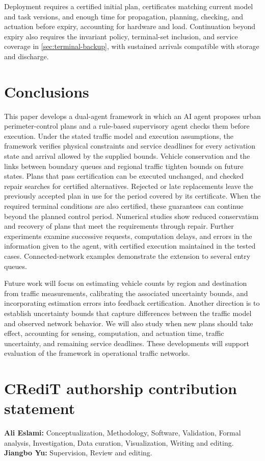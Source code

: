 \documentclass[preprint,12pt]{elsarticle}
\theoremstyle{definition}
\theoremstyle{plain}
\theoremstyle{definition}
\theoremstyle{plain}
\newcommand{\appref}[1]{\ref{#1}}
\begin{document}
Deployment requires a certified initial plan, certificates matching current
model and task versions, and enough time for propagation, planning,
checking, and actuation before expiry, accounting for hardware and load.
Continuation beyond expiry also requires the invariant policy, terminal-set
inclusion, and service coverage in \appref{sec:terminal-backup},
with sustained arrivals compatible with storage and discharge.

\section{Conclusions}
\label{sec:new-conclusion}

This paper develops a dual-agent framework in which an AI agent proposes
urban perimeter-control plans and a rule-based supervisory agent checks
them before execution. Under the stated traffic model and execution
assumptions, the framework verifies physical constraints and service
deadlines for every activation state and arrival allowed by the supplied
bounds. Vehicle conservation and the links between boundary queues and
regional traffic tighten bounds on future states. Plans that pass
certification can be executed unchanged, and checked repair searches for
certified alternatives. Rejected or late replacements leave the previously
accepted plan in use for the period covered by its certificate. When the
required terminal conditions are also certified, these guarantees can
continue beyond the planned control period. Numerical studies show reduced
conservatism and recovery of plans that meet the requirements through
repair. Further experiments examine
successive requests, computation delays, and errors in the information
given to the agent, with certified execution maintained in the tested
cases. Connected-network examples demonstrate the extension to several
entry queues.

Future work will focus on estimating vehicle counts by region and
destination from traffic measurements, calibrating the associated
uncertainty bounds, and incorporating estimation errors into feedback
certification. Another direction is to establish uncertainty bounds
that capture differences between the traffic model and observed network
behavior. We will also study when new plans should take effect, accounting
for sensing, computation, and actuation time, traffic uncertainty, and
remaining service deadlines. These developments will support evaluation of
the framework in operational traffic networks.

\section*{CRediT authorship contribution statement}
\textbf{Ali Eslami:} Conceptualization, Methodology, Software, Validation,
Formal analysis, Investigation, Data curation, Visualization,
Writing and editing.
\textbf{Jiangbo Yu:} Supervision, Review and editing.
\end{document}
